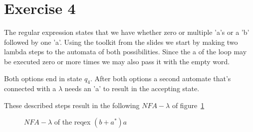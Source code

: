 \documentclass{article}
\begin{document}
\section*{Exercise 4}
The regular expression states that we have whether zero or multiple 'a's or a 'b' followed by one 'a'. Using the toolkit from the slides we start by making two lambda steps to the automata of both possibilities. Since the a of the loop may be executed zero or more times we may also pass it with the empty word.

Both options end in state $q_4$. After both options a second automate that's connected with a $\lambda$ needs an 'a' to result in the accepting state.

These described steps result in the following $NFA-\lambda$ of figure~\ref{Fig:M4}
\begin{figure}[h]
\begin{center}
\end{center}
  \caption{$NFA-\lambda$ of the reqex $(b + a^*)a$} \label{Fig:M4}
\end{figure}
\end{document}
